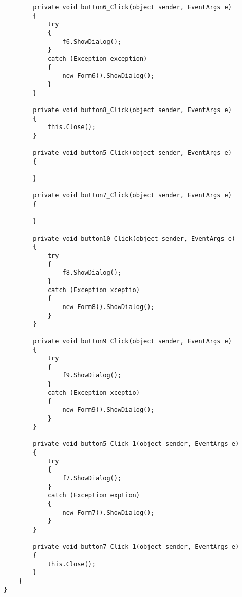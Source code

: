\begin{lstlisting}
        private void button6_Click(object sender, EventArgs e)
        {
            try
            {
                f6.ShowDialog();
            }
            catch (Exception exception)
            {
                new Form6().ShowDialog();
            }
        }

        private void button8_Click(object sender, EventArgs e)
        {
            this.Close();
        }

        private void button5_Click(object sender, EventArgs e)
        {
           
        }

        private void button7_Click(object sender, EventArgs e)
        {
           
        }

        private void button10_Click(object sender, EventArgs e)
        {
            try
            {
                f8.ShowDialog();
            }
            catch (Exception xceptio)
            {
                new Form8().ShowDialog();
            }
        }

        private void button9_Click(object sender, EventArgs e)
        {
            try
            {
                f9.ShowDialog();
            }
            catch (Exception xceptio)
            {
                new Form9().ShowDialog();
            }
        }

        private void button5_Click_1(object sender, EventArgs e)
        {
            try
            {
                f7.ShowDialog();
            }
            catch (Exception exption)
            {
                new Form7().ShowDialog();
            }
        }

        private void button7_Click_1(object sender, EventArgs e)
        {
            this.Close();
        }
    }
}
\end{lstlisting}
